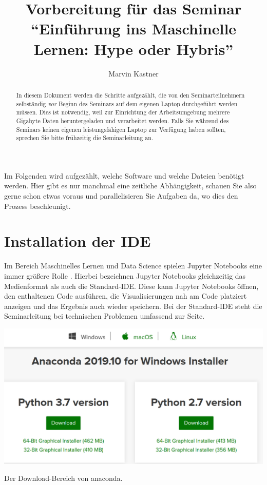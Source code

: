 \documentclass{tufte-handout}
\title{Vorbereitung für das Seminar \enquote{Einführung ins Maschinelle Lernen: Hype oder Hybris}}
\author{Marvin Kastner}
\begin{document}
\maketitle%

\begin{abstract}
\noindent
In diesem Dokument werden die Schritte aufgezählt, die von den Seminarteilnehmern selbständig \emph{vor} Beginn des Seminars auf dem eigenen Laptop durchgeführt werden müssen.
Dies ist notwendig, weil zur Einrichtung der Arbeitsumgebung mehrere Gigabyte Daten heruntergeladen und verarbeitet werden.
Falls Sie während des Seminars keinen eigenen leistungsfähigen Laptop zur Verfügung haben sollten, sprechen Sie bitte frühzeitig die Seminarleitung an.
\end{abstract}

Im Folgenden wird aufgezählt, welche Software und welche Dateien benötigt werden.
Hier gibt es nur manchmal eine zeitliche Abhängigkeit, schauen Sie also gerne schon etwas voraus und parallelisieren Sie Aufgaben da, wo dies den Prozess beschleunigt.


\section{Installation der IDE}

Im Bereich Maschinelles Lernen und Data Science spielen Jupyter Notebooks eine immer größere Rolle%
\cite{perkel_why_2018,hiltch_jupyter_2019}.
Hierbei bezeichnen Jupyter Notebooks gleichzeitig das Medienformat als auch die Standard-IDE.
Diese kann Jupyter Notebooks öffnen, den enthaltenen Code ausführen, die Visualisierungen nah am Code platziert anzeigen und das Ergebnis auch wieder speichern.
Bei der Standard-IDE steht die Seminarleitung bei technischen Problemen umfassend zur Seite.

\begin{marginfigure}
  \includegraphics{anaconda}
  \caption{Der Download-Bereich von anaconda.}%
\label{fig:anaconda}
\end{marginfigure}
\end{document}
